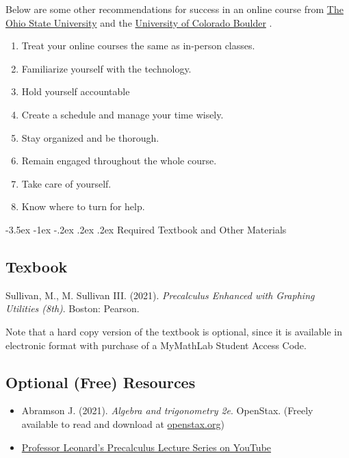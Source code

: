 \documentclass{article}
\makeatletter
\renewcommand\section{\@startsection{section}{1}{0pt}%
  {-3.5ex \@plus -1ex \@minus -.2ex}%
  {.2ex \@plus.2ex}%
  {\normalfont\Large\bfseries}} %
\makeatother
\begin{document}
Below are some other recommendations for success in an online course from \href{https://online.osu.edu/resources/learn/5-online-learning-tips-student-success}{The Ohio State University} and the \href{https://www.colorado.edu/health/tips-succeeding-online-classes}{University of Colorado Boulder} .

\begin{enumerate}
\item Treat your online courses the same as in-person classes.
\item Familiarize yourself with the technology.
\item Hold yourself accountable
\item Create a schedule and manage your time wisely.
\item Stay organized and be thorough.
\item Remain engaged throughout the whole course.
\item Take care of yourself.
\item Know where to turn for help.
\end{enumerate}

\section{Required Textbook and Other Materials}

\subsection{Texbook}

Sullivan, M., M. Sullivan III. (2021). \textit{Precalculus Enhanced with Graphing Utilities (8th)}. Boston: Pearson.

Note that a hard copy version of the textbook is optional, since it is available in electronic format with purchase of a MyMathLab Student Access Code.

\subsection{Optional (Free) Resources}

\begin{itemize}
\item Abramson J. (2021). \textit{Algebra and trigonometry 2e}. OpenStax. (Freely available to read and download at \href{https://openstax.org/details/books/algebra-and-trigonometry-2e.}{openstax.org})


\item \href{https://youtube.com/playlist?list=PLDesaqWTN6ESsmwELdrzhcGiRhk5DjwLP\&si=G7hNZvDueWkJ9Ydf}{Professor Leonard's Precalculus Lecture Series on YouTube}
\end{itemize}
\end{document}
